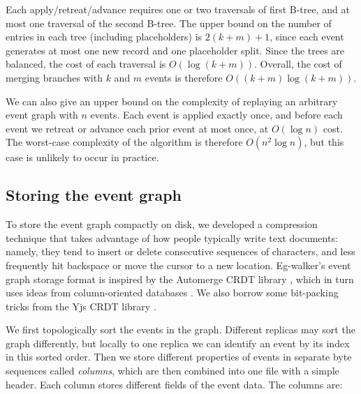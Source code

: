 \documentclass[sigplan,10pt]{acmart}
\newcommand{\algname}{Eg-walker\xspace}
\begin{document}
Each apply/retreat/advance requires one or two traversals of first B-tree, and at most one traversal of the second B-tree.
The upper bound on the number of entries in each tree (including placeholders) is $2(k+m)+1$, since each event generates at most one new record and one placeholder split.
Since the trees are balanced, the cost of each traversal is $O(\log(k+m))$.
Overall, the cost of merging branches with $k$ and $m$ events is therefore $O((k+m) \log(k+m))$.

We can also give an upper bound on the complexity of replaying an arbitrary event graph with $n$ events.
Each event is applied exactly once, and before each event we retreat or advance each prior event at most once, at $O(\log n)$ cost.
The worst-case complexity of the algorithm is therefore $O(n^2 \log n)$, but this case is unlikely to occur in practice.

\subsection{Storing the event graph}\label{storage}

To store the event graph compactly on disk, we developed a compression technique that takes advantage of how people typically write text documents: namely, they tend to insert or delete consecutive sequences of characters, and less frequently hit backspace or move the cursor to a new location.
\algname's event graph storage format is inspired by the Automerge CRDT library \cite{automerge-storage,automerge-columnar}, which in turn uses ideas from column-oriented databases \cite{Abadi2013,Stonebraker2005}. We also borrow some bit-packing tricks from the Yjs CRDT library \cite{yjs}.

We first topologically sort the events in the graph. Different replicas may sort the graph differently, but locally to one replica we can identify an event by its index in this sorted order.
Then we store different properties of events in separate byte sequences called \emph{columns}, which are then combined into one file with a simple header.
Each column stores different fields of the event data. The columns are:
\end{document}
